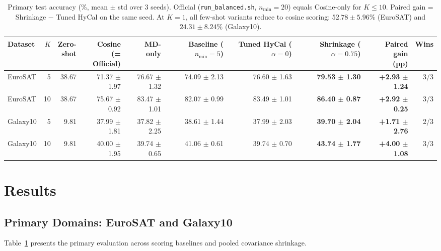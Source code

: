 \documentclass[letterpaper]{article} %
\newcommand{\nmin}{n_{\min}}
\begin{document}
\begin{table}[t]
\centering
\footnotesize
\setlength{\tabcolsep}{4pt}
\begin{tabular}{@{}lrrrrrrrrr@{}}
\toprule
Dataset & $K$ & \shortstack{Zero-\\shot} & \shortstack{Cosine\\(= Official)} & \shortstack{MD-\\only} & \shortstack{Baseline\\($\nmin{=}5$)} & \shortstack{Tuned HyCal\\($\alpha{=}0$)} & \shortstack{Shrinkage\\($\alpha{=}0.75$)} & \shortstack{Paired gain\\(pp)} & Wins \\
\midrule
EuroSAT & 5 & 38.67 & 71.37 $\pm$ 1.97 & 76.67 $\pm$ 1.32 & 74.09 $\pm$ 2.13 & 76.60 $\pm$ 1.63 & \textbf{79.53 $\pm$ 1.30} & \textbf{+2.93 $\pm$ 1.24} & 3/3 \\
EuroSAT & 10 & 38.67 & 75.67 $\pm$ 0.92 & 83.47 $\pm$ 1.01 & 82.07 $\pm$ 0.99 & 83.49 $\pm$ 1.01 & \textbf{86.40 $\pm$ 0.87} & \textbf{+2.92 $\pm$ 0.25} & 3/3 \\
Galaxy10 & 5 & 9.81 & 37.99 $\pm$ 1.81 & 37.82 $\pm$ 2.25 & 38.61 $\pm$ 1.44 & 37.99 $\pm$ 2.03 & \textbf{39.70 $\pm$ 2.04} & \textbf{+1.71 $\pm$ 2.76} & 2/3 \\
Galaxy10 & 10 & 9.81 & 40.00 $\pm$ 1.95 & 39.74 $\pm$ 0.65 & 41.06 $\pm$ 0.61 & 39.74 $\pm$ 0.70 & \textbf{43.74 $\pm$ 1.77} & \textbf{+4.00 $\pm$ 1.08} & 3/3 \\
\bottomrule
\end{tabular}
\caption{Primary test accuracy (\%, mean $\pm$ std over 3 seeds). Official (\texttt{run\_balanced.sh}, $\nmin=20$) equals Cosine-only for $K \le 10$. Paired gain = Shrinkage $-$ Tuned HyCal on the same seed. At $K = 1$, all few-shot variants reduce to cosine scoring: $52.78 \pm 5.96\%$ (EuroSAT) and $24.31 \pm 8.24\%$ (Galaxy10).}
\label{tab:main}
\end{table}

\section{Results}

\subsection{Primary Domains: EuroSAT and Galaxy10}

Table~\ref{tab:main} presents the primary evaluation across scoring baselines and pooled covariance shrinkage.
\end{document}

